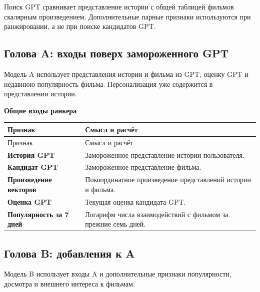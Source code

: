 \documentclass[11pt,a4paper]{article}
\begin{document}
Поиск GPT сравнивает представление истории с общей таблицей фильмов скалярным произведением. Дополнительные парные признаки используются при ранжировании, а не при поиске кандидатов GPT.

\subsection{Голова A: входы поверх замороженного GPT}

Модель A использует представления истории и фильма из GPT, оценку GPT и недавнюю популярность фильма. Персонализация уже содержится в представлении истории.

\textbf{Общие входы ранкера}


\begin{longtable}{>{\raggedright\arraybackslash}p{4.1cm}>{\raggedright\arraybackslash}p{10.8cm}}
\toprule
Признак & Смысл и расчёт \\
\midrule
\endfirsthead
\toprule
Признак & Смысл и расчёт \\
\midrule
\endhead
\textbf{История GPT} & Замороженное представление истории пользователя. \\[4pt]
\textbf{Кандидат GPT} & Замороженное представление фильма. \\[4pt]
\textbf{Произведение векторов} & Покоординатное произведение представлений истории и фильма. \\[4pt]
\textbf{Оценка GPT} & Текущая оценка кандидата GPT. \\[4pt]
\textbf{Популярность за 7 дней} & Логарифм числа взаимодействий с фильмом за прежние семь дней. \\[4pt]
\bottomrule
\end{longtable}

\newpage

\subsection{Голова B: добавления к A}

Модель B использует входы A и дополнительные признаки популярности, досмотра и внешнего интереса к фильмам.
\end{document}
